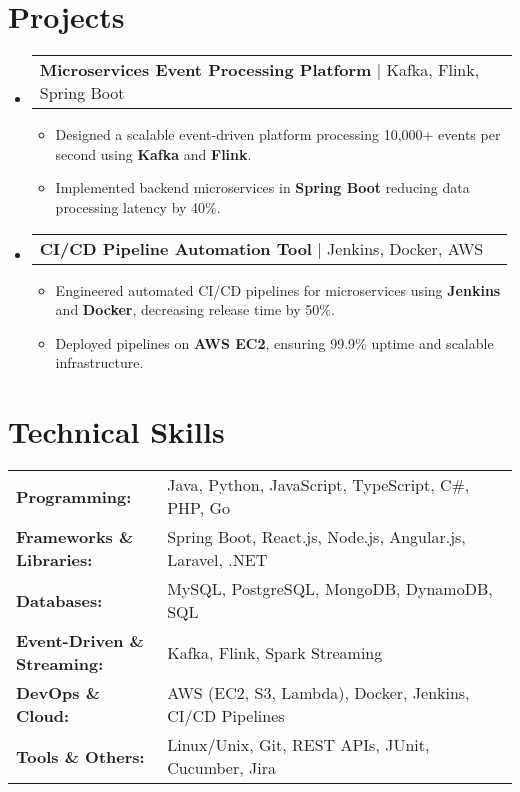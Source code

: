 \documentclass[letterpaper,11pt]{article}
\makeatletter
\newcommand{\resumeItem}[1]{
  \item\footnotesize{
    {#1 \vspace{-2pt}}
  }
}
\newcommand{\resumeProjectHeading}[2]{
    \item
    \begin{tabular*}{1.001\textwidth}{l@{\extracolsep{\fill}}r}
      \small#1 & \textbf{\small #2}\\
    \end{tabular*}\vspace{-7pt}
}
\newcommand{\resumeSubHeadingListStart}{\begin{itemize}[leftmargin=0pt, label={}]}
\newcommand{\resumeSubHeadingListEnd}{\end{itemize}}
\newcommand{\resumeItemListStart}{\begin{itemize}[leftmargin=*]}
\newcommand{\resumeItemListEnd}{\end{itemize}\vspace{-5pt}}
\makeatother
\begin{document}
\section{Projects}
    \vspace{-5pt}
    \resumeSubHeadingListStart
      \resumeProjectHeading
          {\textbf{Microservices Event Processing Platform} | Kafka, Flink, Spring Boot}
          {}
          \resumeItemListStart
              \resumeItem{Designed a scalable event-driven platform processing 10,000+ events per second using \textbf{Kafka} and \textbf{Flink}.}
              \resumeItem{Implemented backend microservices in \textbf{Spring Boot} reducing data processing latency by 40\%.}
          \resumeItemListEnd
          \vspace{-16pt}
      \resumeProjectHeading
          {\textbf{CI/CD Pipeline Automation Tool} | Jenkins, Docker, AWS}
          {}
          \resumeItemListStart
              \resumeItem{Engineered automated CI/CD pipelines for microservices using \textbf{Jenkins} and \textbf{Docker}, decreasing release time by 50\%.}
              \resumeItem{Deployed pipelines on \textbf{AWS EC2}, ensuring 99.9\% uptime and scalable infrastructure.}
          \resumeItemListEnd
    \resumeSubHeadingListEnd
\vspace{-10pt}
\section{Technical Skills}
        \vspace{-14pt}
        \begin{table}[h]
            \footnotesize
            \begin{tabular}{p{0.3\linewidth} p{0.7\linewidth}}
                \textbf{Programming:} & Java, Python, JavaScript, TypeScript, C\#, PHP, Go \\
                \textbf{Frameworks \& Libraries:} & Spring Boot, React.js, Node.js, Angular.js, Laravel, .NET \\
                \textbf{Databases:} & MySQL, PostgreSQL, MongoDB, DynamoDB, SQL \\
                \textbf{Event-Driven \& Streaming:} & Kafka, Flink, Spark Streaming \\
                \textbf{DevOps \& Cloud:} & AWS (EC2, S3, Lambda), Docker, Jenkins, CI/CD Pipelines \\
                \textbf{Tools \& Others:} & Linux/Unix, Git, REST APIs, JUnit, Cucumber, Jira \\
            \end{tabular}
        \end{table}
\end{document}
